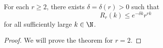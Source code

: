 %


\begin{theorem}[Balister et al. 2024] \label{thm:Ramsey:multicolour}
    For each $r \ge 2$, there exists $\delta = \delta(r) > 0$ such that 
    \begin{equation*}
        R_r(k) \le e^{-\delta k} r^{rk}
    \end{equation*} 
    for all sufficiently large $k \in \N$. 
\end{theorem}

\begin{proof}
    We will prove the theorem for $r = 2$.
\end{proof}
